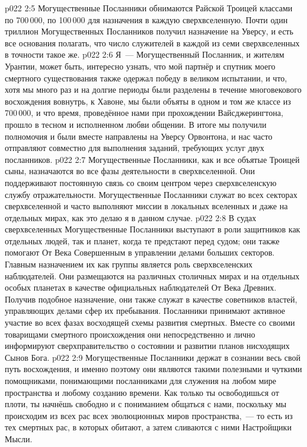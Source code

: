 \vs p022 2:5 Могущественные Посланники обнимаются Райской Троицей классами по 700\,000, по 100\,000 для назначения в каждую сверхвселенную. Почти один триллион Могущественных Посланников получил назначение на Уверсу, и есть все основания полагать, что число служителей в каждой из семи сверхвселенных в точности такое же.
\vs p022 2:6 \pc Я~--- Могущественный Посланник, и жителям Урантии, может быть, интересно узнать, что мой партнёр и спутник моего смертного существования также одержал победу в великом испытании, и что, хотя мы много раз и на долгие периоды были разделены в течение многовекового восхождения вовнутрь, к Хавоне, мы были объяты в одном и том же классе из 700\,000, и что время, проведённое нами при прохождении Вайсджерингтона, прошло в тесном и исполненном любви общении. В итоге мы получили полномочия и были вместе направлены на Уверсу Орвонтона, и нас часто отправляют совместно для выполнения заданий, требующих услуг двух посланников.
\vs p022 2:7 \pc Могущественные Посланники, как и все объятые Троицей сыны, назначаются во все фазы деятельности в сверхвселенной. Они поддерживают постоянную связь со своим центром через сверхвселенскую службу отражательности. Могущественные Посланники служат во всех секторах сверхвселенной и часто выполняют миссии в локальных вселенных и даже на отдельных мирах, как это делаю я в данном случае.
\vs p022 2:8 В судах сверхвселенных Могущественные Посланники выступают в роли защитников как отдельных людей, так и планет, когда те предстают перед судом; они также помогают От Века Совершенным в управлении делами больших секторов. Главным назначением их как группы является роль сверхвселенских наблюдателей. Они размещаются на различных столичных мирах и на отдельных особых планетах в качестве официальных наблюдателей От Века Древних. Получив подобное назначение, они также служат в качестве советников властей, управляющих делами сфер их пребывания. Посланники принимают активное участие во всех фазах восходящей схемы развития смертных. Вместе со своими товарищами смертного происхождения они непосредственно и лично информируют сверхправительство о состоянии и развитии планов нисходящих Сынов Бога.
\vs p022 2:9 Могущественные Посланники держат в сознании весь свой путь восхождения, и именно поэтому они являются такими полезными и чуткими помощниками, понимающими посланниками для служения на любом мире пространства и любому созданию времени. Как только ты освободишься от плоти, ты начнёшь свободно и с пониманием общаться с нами, поскольку мы происходим из всех рас всех эволюционных миров пространства,~--- то есть из тех смертных рас, в которых обитают, а затем сливаются с ними Настройщики Мысли.
